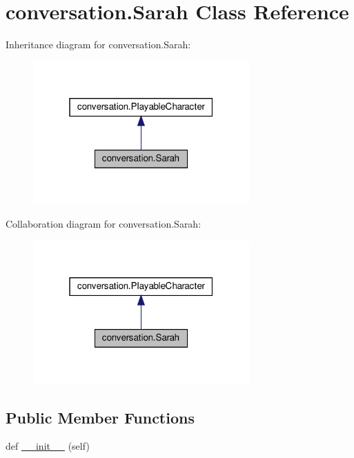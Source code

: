 \hypertarget{classconversation_1_1Sarah}{}\section{conversation.\+Sarah Class Reference}
\label{classconversation_1_1Sarah}


Inheritance diagram for conversation.\+Sarah\+:\nopagebreak
\begin{figure}[H]
\begin{center}
\leavevmode
\includegraphics[width=235pt]{classconversation_1_1Sarah__inherit__graph}
\end{center}
\end{figure}


Collaboration diagram for conversation.\+Sarah\+:\nopagebreak
\begin{figure}[H]
\begin{center}
\leavevmode
\includegraphics[width=235pt]{classconversation_1_1Sarah__coll__graph}
\end{center}
\end{figure}
\subsection*{Public Member Functions}
\begin{DoxyCompactItemize}
\item 
def \hyperlink{classconversation_1_1Sarah_a12c3e90cec8309ef7260fcef838277dc}{\+\_\+\+\_\+init\+\_\+\+\_\+} (self)
\end{DoxyCompactItemize}
